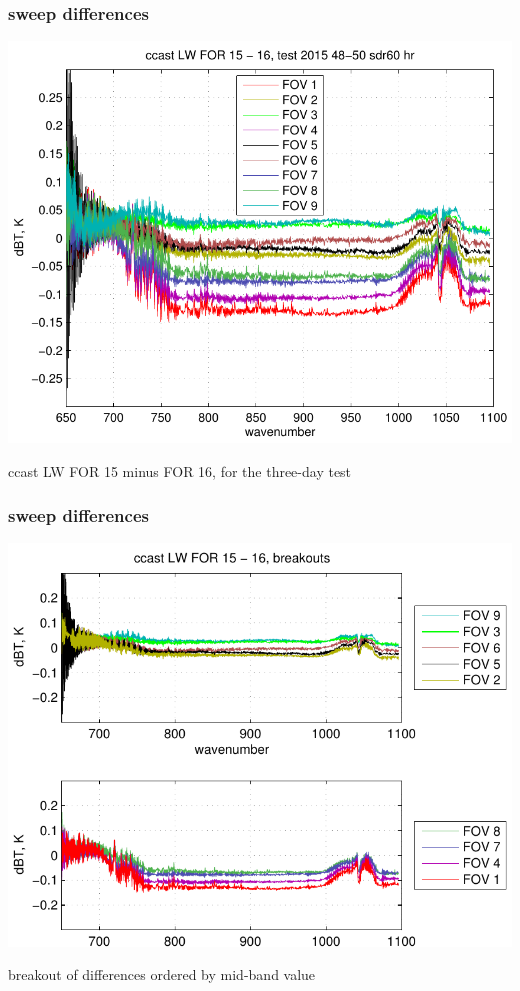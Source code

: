 \documentclass[11pt]{beamer}
\begin{document}
\begin{frame}
\frametitle{sweep differences}
\begin{center}
  \includegraphics[scale=0.6]{figures/ccast_LW_sdif_2015_48-50_sdr60_hr.pdf}

ccast LW FOR 15 minus FOR 16, for the three-day test

\end{center}
\end{frame}
\begin{frame}
\frametitle{sweep differences}
\begin{center}
  \includegraphics[scale=0.6]{figures/ccast_LW_sbrk_2015_48-50_sdr60_hr.pdf}

breakout of differences ordered by mid-band value

\end{center}
\end{frame}
\end{document}
